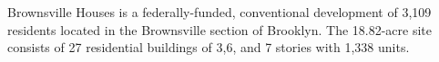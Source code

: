 Brownsville Houses is a federally-funded, conventional development of 3,109 residents located in the Brownsville section of Brooklyn. The 18.82-acre site consists of 27 residential buildings of 3,6, and 7 stories with 1,338 units.